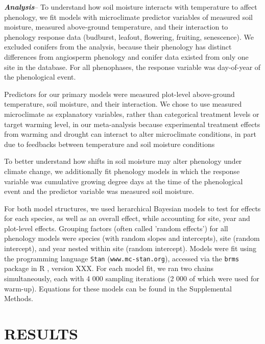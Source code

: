 \documentclass{article}
\begin{document}
\textbf {\emph{Analysis}}--
To understand how soil moisture interacts with temperature to affect phenology, we fit models with microclimate predictor variables of measured soil moisture, measured above-ground temperature, and their interaction to phenology response data (budburst, leafout, flowering, fruiting, senescence). We excluded conifers from the analysis, because their phenology has distinct differences from angiosperm phenology \cite{polgar2014} and conifer data existed from only one site in the database. For all phenophases, the response variable was day-of-year of the phenological event. 
\par Predictors for our primary models were measured plot-level above-ground temperature, soil moisture, and their interaction. We chose to use measured microclimate as explanatory variables, rather than categorical treatment levels or target warming level, in our meta-analysis because experimental treatment effects from warming and drought can interact to alter microclimate conditions, in part due to feedbacks between temperature and soil moisture conditions \citep{ettinger2019,mcdaniel2014}

\par To better understand how shifts in soil moisture may alter phenology under climate change, we additionally fit phenology models in which the response variable was cumulative growing degree days at the time of the phenological event and the predictor variable was measured soil moisture.  

\par For both model structures, we used herarchical Bayesian models to test for effects for each species, as well as an overall effect, while accounting for site, year and plot-level effects. Grouping factors (often called 'random effects') for all phenology models were species (with random slopes and intercepts), site (random intercept), and year nested within site (random intercept). Models were fit using the programming language \texttt{Stan} \citep{Carpenter:2016aa} (\texttt{www.mc-stan.org}), accessed via the \texttt{brms}\citep{brms2021} package in R \citep{Rcore2022}, version XXX.  For each model fit, we ran two chains simultaneously, each with 4 000 sampling iterations (2 000 of which were used for warm-up). Equations for these models can be found in the Supplemental Methods. 

\section* {RESULTS}
\end{document}
